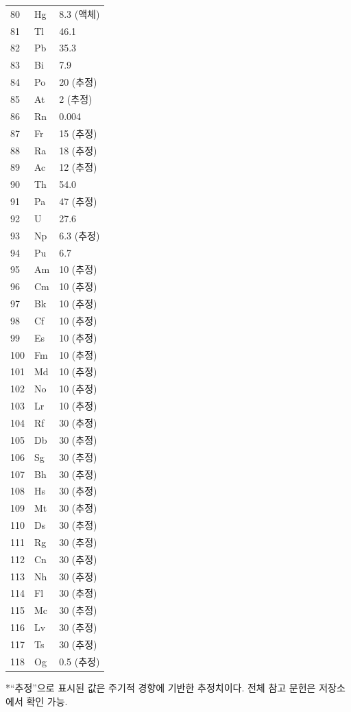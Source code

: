 \documentclass[12pt,a4paper]{article}
\begin{document}
\begin{longtable}{p{0.6cm}p{1.2cm}p{1.5cm}}
		80 & Hg & 8.3 (액체) \\
		81 & Tl & 46.1 \\
		82 & Pb & 35.3 \\
		83 & Bi & 7.9 \\
		84 & Po & 20 (추정) \\
		85 & At & 2 (추정) \\
		86 & Rn & 0.004 \\
		87 & Fr & 15 (추정) \\
		88 & Ra & 18 (추정) \\
		89 & Ac & 12 (추정) \\
		90 & Th & 54.0 \\
		91 & Pa & 47 (추정) \\
		92 & U  & 27.6 \\
		93 & Np & 6.3 (추정) \\
		94 & Pu & 6.7 \\
		95 & Am & 10 (추정) \\
		96 & Cm & 10 (추정) \\
		97 & Bk & 10 (추정) \\
		98 & Cf & 10 (추정) \\
		99 & Es & 10 (추정) \\
		100& Fm & 10 (추정) \\
		101& Md & 10 (추정) \\
		102& No & 10 (추정) \\
		103& Lr & 10 (추정) \\
		104& Rf & 30 (추정) \\
		105& Db & 30 (추정) \\
		106& Sg & 30 (추정) \\
		107& Bh & 30 (추정) \\
		108& Hs & 30 (추정) \\
		109& Mt & 30 (추정) \\
		110& Ds & 30 (추정) \\
		111& Rg & 30 (추정) \\
		112& Cn & 30 (추정) \\
		113& Nh & 30 (추정) \\
		114& Fl & 30 (추정) \\
		115& Mc & 30 (추정) \\
		116& Lv & 30 (추정) \\
		117& Ts & 30 (추정) \\
		118& Og & 0.5 (추정) \\
		\bottomrule
	\end{longtable}
	*“추정”으로 표시된 값은 주기적 경향에 기반한 추정치이다. 전체 참고 문헌은 저장소에서 확인 가능.
	
\end{document}
